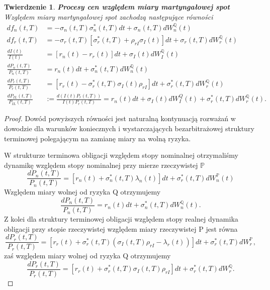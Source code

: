 \documentclass{mini}
\theoremstyle{mythstyle}
\newtheorem{Twierdzenie}{Twierdzenie}[chapter]
\begin{document}
	\begin{Twierdzenie} \textbf{Procesy cen względem miary martyngałowej spot}\\
	Względem miary martyngałowej spot zachodzą następujące równości
		\begin{align}
		df_n(t,T) &= -\sigma_n(t,T) \sigma^*_n(t,T)dt + \sigma_n(t,T)dW_n^\mathbb{Q}(t) \\
		df_r(t,T) &= -\sigma_r(t,T) [\sigma^*_r(t,T) + \rho_{rI}\sigma_I(t)]dt + \sigma_r(t,T)dW_r^\mathbb{Q}(t)\\
		\frac{dI(t)}{I(t)} &= [r_n(t) - r_r(t)] dt + \sigma_I(t)dW_I^\mathbb{Q}(t)\\
		\frac{dP_n(t,T)}{P_n(t,T)} &= r_n(t)dt + \sigma^*_n(t,T)dW_n^\mathbb{Q}(t)\\
		\frac{dP_r(t,T)}{P_r(t,T)} &= [r_r(t) - \sigma^*_r(t,T)\sigma_I(t)\rho_{rI}]dt + \sigma^*_r(t,T) dW_r^\mathbb{Q}(t)\\
		\frac{dP_{IL}(t,T)}{P_{IL}(t,T)} &:= \frac{d(I(t)P_r(t,T))}{I(t)P_r(t,T)} = r_n(t)dt + \sigma_I(t)dW_I^Q(t) + \sigma^*_r(t,T) dW_r^\mathbb{Q}(t).  
		\end{align}
	\end{Twierdzenie}

\begin{proof}
	 Dowód powyższych równości jest naturalną kontynuacją rozważań w dowodzie dla warunków koniecznych i wystarczających bezarbitrażowej struktury terminowej polegającym na zamianę miary na wolną ryzyka.
	 
	 W strukturze terminowa obligacji względem stopy nominalnej otrzymaliśmy dynamikę względem stopy nominalnej przy mierze rzeczywistej $\mathbb{P}$
	 \begin{equation}
	 \frac{dP_n(t,T)}{P_n(t,T)} = [r_n(t) +\sigma^*_n(t,T)\lambda_n(t)]dt + \sigma^*_r(t,T)dW^\mathbb{P}_n(t)
	 \end{equation}
	 Względem miary wolnej od ryzyka Q otrzymujemy
	 \begin{equation}
	 \frac{dP_n(t,T)}{P_n(t,T)} = r_n(t)dt + \sigma^*_n(t,T)dW^\mathbb{Q}_n(t).
	 \end{equation}
	 Z kolei dla struktury terminowej obligacji względem stopy realnej dynamika obligacji przy stopie rzeczywistej względem miary rzeczywistej P jest równa
	 \begin{equation}
	 \frac{dP_r(t,T)}{P_r(t,T)} = [r_r(t) +\sigma^*_r(t,T)(\sigma_I(t,T)\rho_{rI}-\lambda_r(t))]dt + \sigma^*_r(t,T)dW^\mathbb{P}_r,
	 \end{equation}
	 zaś względem miary wolnej od ryzyka Q otrzymujemy
	 \begin{equation}
	 \frac{dP_r(t,T)}{P_r(t,T)} = [r_r(t) +\sigma^*_r(t,T)\sigma_I(t,T)\rho_{rI}]dt + \sigma^*_r(t,T)dW^\mathbb{Q}_r.
	 \end{equation}
	 
	 
\end{proof}
	
\end{document}
